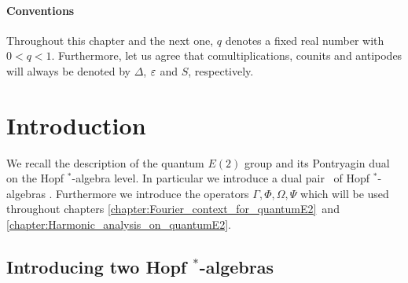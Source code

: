 
\paragraph{Conventions}
Throughout this chapter and the next one, $q$ denotes a fixed real number
with \mbox{$0<q<1$}.
Furthermore, let us agree that comultiplications, counits and antipodes
will always be denoted by $\Delta$, $\varepsilon$ and $S$, respectively.


\section{Introduction}
\label{par:E2:introduction}


\begin{abs_chp}
We recall the description of the quantum $E(2)$ group and its Pontryagin dual
on the Hopf $^*$-algebra level. In particular we introduce a dual pair \UqAq\
of Hopf $^*$-algebras \cite{Koelink:thesis,Koelink:QE2,FonsWor:QE2,Wor:Affiliated}\@.
Furthermore we introduce the operators $\Gamma,\Phi,\Omega,\Psi$ which will
be used throughout chapters
\ref{chapter:Fourier_context_for_quantumE2}\ and
\ref{chapter:Harmonic_analysis_on_quantumE2}\@.
\end{abs_chp}


\subsection{Introducing two Hopf $^*$-algebras}

